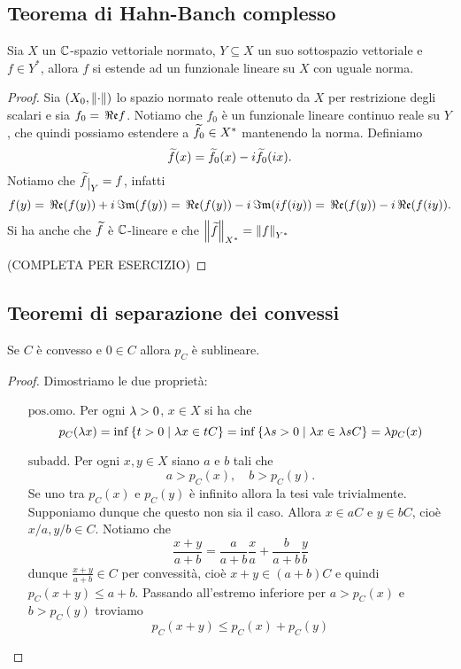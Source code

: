 \subsection{Teorema di Hahn-Banch complesso}
\begin{theorem}\label{ThHahnBanachComplesso}
    Sia $X$ un $\mathbb{C}$-spazio vettoriale normato, $Y\subseteq X$ un suo sottospazio vettoriale e $f\in Y^\ast$, allora $f$ si estende ad un funzionale lineare su $X$ con uguale norma.
\end{theorem}
\begin{proof}
Sia $(X_0,\left\Vert{\cdot}\right\Vert)$ lo spazio normato reale ottenuto da $X$ per restrizione degli scalari e sia $f_0=\,\Re\mathfrak{e} f$. Notiamo che $f_0$ \`e un funzionale lineare continuo reale su $Y$, che quindi possiamo estendere a $\widetilde{f}_0\in X^\ast$ mantenendo la norma. Definiamo \[\widetilde{f}(x)=\widetilde{f}_0(x)-i\widetilde{f}_0(ix).\]
Notiamo che $\wt f\res Y=f$, infatti 
\[f(y)=\,\Re\mathfrak{e}(f(y))+i\,\Im\mathfrak{m}(f(y))=\,\Re\mathfrak{e}(f(y))-i\,\Im\mathfrak{m}(if(iy))=\,\Re\mathfrak{e}(f(y))-i\,\Re\mathfrak{e}(f(iy)).\]
Si ha anche che $\widetilde{f}$ \`e $\mathbb{C}$-lineare e che $\left\Vert{\widetilde{f}}\right\Vert_{X^\ast}=\left\Vert{f}\right\Vert_{Y^\ast}$

(COMPLETA PER ESERCIZIO)
\end{proof}





\subsection{Teoremi di separazione dei convessi}

\begin{proposition}\label{PrFunzionaliMinkowskiSonoSublineari}
Se $C$ \`e convesso e $0\in C$ allora $p_C$ \`e sublineare.
\end{proposition}
\begin{proof}
Dimostriamo le due propriet\`a:
\setlength{\leftmargini}{0cm}
\begin{itemize}
    \item[$\boxed{\text{pos.omo.}}$] Per ogni $\lambda>0$, $x\in X$ si ha che
    \[p_C(\lambda x)=\inf\left\{{t>0\mid \lambda x\in tC}\right\}=\inf\left\{{\lambda s>0\mid \lambda x\in\lambda sC}\right\}=\lambda p_C(x)\]
    \item[$\boxed{\text{subadd.}}$] Per ogni $x,y\in X$ siano $a$ e $b$ tali che
    \[a>p_C(x),\quad b>p_C(y).\]
    Se uno tra $p_C(x)$ e $p_C(y)$ \`e infinito allora la tesi vale trivialmente. Supponiamo dunque che questo non sia il caso.
    Allora $x\in aC$ e $y\in bC$, cio\`e $x/a,y/b\in C$. Notiamo che
    \[\frac{x+y}{a+b}=\frac a{a+b}\frac xa+\frac b{a+b}\frac yb\]
    dunque $\frac{x+y}{a+b}\in C$ per convessit\`a, cio\`e $x+y\in (a+b)C$ e quindi $p_C(x+y)\leq a+b$. Passando all'estremo inferiore per $a>p_C(x)$ e $b>p_C(y)$ troviamo
    \[p_C(x+y)\leq p_C(x)+p_C(y)\]
\end{itemize}
\setlength{\leftmargini}{0.5cm}
\end{proof}


